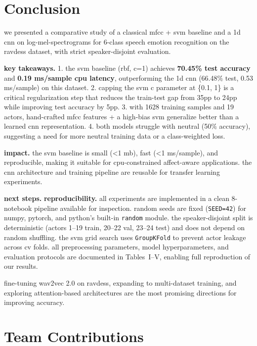 \documentclass[conference]{IEEEtran}
\begin{document}
{\section{Conclusion}\label{conclusion}

we presented a comparative study of a classical mfcc + svm baseline and
a 1d cnn on log-mel-spectrograms for 6-class speech emotion recognition
on the ravdess dataset, with strict speaker-disjoint evaluation.

\textbf{key takeaways.} 1. the svm baseline (rbf, c=1) achieves
\textbf{70.45\% test accuracy} and \textbf{0.19 ms/sample cpu latency},
outperforming the 1d cnn (66.48\% test, 0.53 ms/sample) on this dataset.
2. capping the svm c parameter at \{0.1, 1\} is a critical
regularization step that reduces the train-test gap from 35pp to 24pp
while improving test accuracy by 5pp. 3. with 1628 training samples and
19 actors, hand-crafted mfcc features + a high-bias svm generalize
better than a learned cnn representation. 4. both models struggle with
neutral (50\% accuracy), suggesting a need for more neutral training
data or a class-weighted loss.

\textbf{impact.} the svm baseline is small (\textless1 mb), fast
(\textless1 ms/sample), and reproducible, making it suitable for
cpu-constrained affect-aware applications. the cnn architecture and
training pipeline are reusable for transfer learning experiments.

\textbf{next steps.} 
\textbf{reproducibility.} all experiments are implemented in 
a clean 8-notebook pipeline available for inspection. 
random seeds are fixed (\texttt{SEED=42}) for numpy, 
pytorch, and python's built-in \texttt{random} module. 
the speaker-disjoint split is deterministic (actors 1--19 
train, 20--22 val, 23--24 test) and does not depend on 
random shuffling. the svm grid search uses 
\texttt{GroupKFold} to prevent actor leakage across 
cv folds. all preprocessing parameters, model 
hyperparameters, and evaluation protocols are documented 
in Tables~I--V, enabling full reproduction of our results.

fine-tuning wav2vec 2.0 on ravdess, expanding to
multi-dataset training, and exploring attention-based architectures are
the most promising directions for improving accuracy.


\section{Team Contributions}\label{team-contributions}

}
\end{document}
